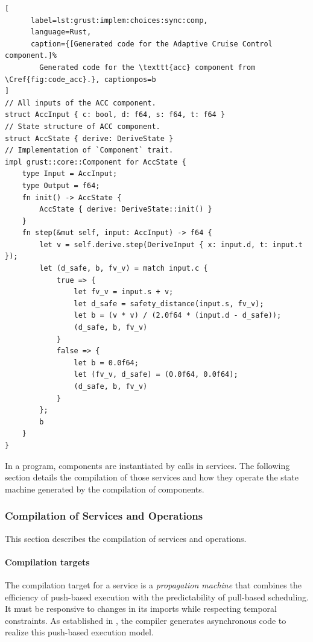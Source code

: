 \begin{lstlisting}[
      label=lst:grust:implem:choices:sync:comp,
      language=Rust,
      caption={[Generated code for the Adaptive Cruise Control component.]%
        Generated code for the \texttt{acc} component from \Cref{fig:code_acc}.}, captionpos=b
]
// All inputs of the ACC component.
struct AccInput { c: bool, d: f64, s: f64, t: f64 }
// State structure of ACC component.
struct AccState { derive: DeriveState }
// Implementation of `Component` trait.
impl grust::core::Component for AccState {
    type Input = AccInput;
    type Output = f64;
    fn init() -> AccState {
        AccState { derive: DeriveState::init() }
    }
    fn step(&mut self, input: AccInput) -> f64 {
        let v = self.derive.step(DeriveInput { x: input.d, t: input.t });
        let (d_safe, b, fv_v) = match input.c {
            true => {
                let fv_v = input.s + v;
                let d_safe = safety_distance(input.s, fv_v);
                let b = (v * v) / (2.0f64 * (input.d - d_safe));
                (d_safe, b, fv_v)
            }
            false => {
                let b = 0.0f64;
                let (fv_v, d_safe) = (0.0f64, 0.0f64);
                (d_safe, b, fv_v)
            }
        };
        b
    }
}
\end{lstlisting}

In a \GRust program, components are instantiated by calls in services. The following section details
the compilation of those services and how they operate the state machine generated by the
compilation of components.

\subsubsection{Compilation of \GRFRP Services and \GReact Operations}
\label{sec:grust:implem:choices:frp}

This section describes the compilation of \GRFRP services and \GReact operations.

\paragraph{Compilation targets}

The compilation target for a service is a \emph{propagation machine} that combines
the efficiency of push-based execution with the predictability of pull-based scheduling.
It must be responsive to changes in its imports while respecting temporal constraints.
As established in ,
the compiler generates asynchronous \Rust code to realize this push-based execution model.

